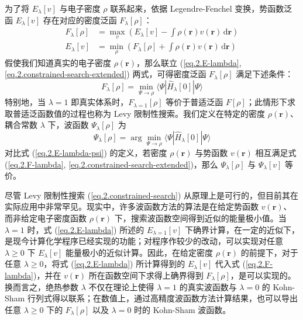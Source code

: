 为了将 $E_\lambda [v]$ 与电子密度 $\rho$ 联系起来，依据 Legendre-Fenchel 变换，势函数泛函 $E_\lambda [v]$ 存在对应的密度泛函 $F_\lambda [\rho]$\cite{Lieb-Lieb.IJQC.1983, Teale-Helgaker.JCP.2009}：
\begin{align}
  \label{eq.2.F-lambda}
  F_\lambda [\rho] &= \max_v \left( E_\lambda [v] - \int \rho(\bm{r}) v(\bm{r}) \, \mathrm{d} \bm{r} \right) \\
  \label{eq.2.constrained-search-extended}
  E_\lambda [v] &= \min_\rho \left( F_\lambda [\rho] + \int \rho(\bm{r}) v(\bm{r}) \, \mathrm{d} \bm{r} \right)
\end{align}
假使我们知道真实的电子密度 $\rho(\bm{r})$，那么联立 (\ref{eq.2.E-lambda}, \ref{eq.2.constrained-search-extended}) 两式，可得密度泛函 $F_\lambda [\rho]$ 满足下述条件：
\begin{equation}
  \label{eq.2.constrained-search}
  F_\lambda[\rho] = \min_{\Psi \rightarrow \rho} \langle \Psi | \hat H_\lambda [0] | \Psi \rangle
\end{equation}
特别地，当 $\lambda = 1$ 即真实体系时，$F_{\lambda=1} [\rho]$ 等价于普适泛函 $F[\rho]$；此情形下求取普适泛函数值的过程也称为 Levy 限制性搜索\cite{Levy-Levy.PNAS.1979}。我们定义在特定的密度 $\rho(\bm{r})$、耦合常数 $\lambda$ 下，波函数 $\Psi_\lambda [\rho]$ 为
\begin{equation}
  \Psi_\lambda [\rho] = \arg \min_{\Psi \rightarrow \rho} \langle \Psi | \hat H_\lambda [0] | \Psi \rangle
\end{equation}
对比式 (\ref{eq.2.E-lambda-psi}) 的定义，若密度 $\rho(\bm{r})$ 与势函数 $v(\bm{r})$ 相互满足式 (\ref{eq.2.F-lambda}, \ref{eq.2.constrained-search-extended})，那么 $\Psi_\lambda [\rho]$ 与 $\Psi_\lambda [v]$ 等价。

尽管 Levy 限制性搜索 (\ref{eq.2.constrained-search}) 从原理上是可行的，但目前其在实际应用中非常罕见。现实中，许多波函数方法的算法是在给定势函数 $v(\bm{r})$、而非给定电子密度函数 $\rho(\bm{r})$ 下，搜索波函数空间得到近似的能量极小值。当 $\lambda=1$ 时，式 (\ref{eq.2.E-lambda}) 所述的 $E_{\lambda=1} [v]$ 下确界计算，在一定的近似下，是现今计算化学程序已经实现的功能；对程序作较少的改动，可以实现对任意 $\lambda \geqslant 0$ 下 $E_\lambda [v]$ 能量极小的近似计算。因此，在给定密度 $\rho (\bm{r})$ 的前提下，对于任意 $\lambda \geqslant 0$，将式 (\ref{eq.2.E-lambda}) 所计算得到的 $E_\lambda [v]$ 代入式 (\ref{eq.2.F-lambda})，并在 $v(\bm{r})$ 所在函数空间下求得上确界得到 $F_\lambda[\rho]$，是可以实现的\cite{Teale-Helgaker.JCP.2009}。换而言之，绝热参数 $\lambda$ 不仅在理论上使得 $\lambda = 1$ 的真实波函数与 $\lambda = 0$ 的 Kohn-Sham 行列式得以联系；在数值上，通过高精度波函数方法计算结果，也可以导出任意 $\lambda \geqslant 0$ 下的 $F_\lambda [\rho]$ 以及 $\lambda = 0$ 时的 Kohn-Sham 波函数。

